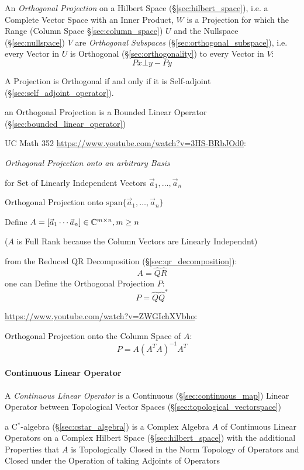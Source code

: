 An \emph{Orthogonal Projection} on a Hilbert Space (\S\ref{sec:hilbert_space}),
i.e. a Complete Vector Space with an Inner Product,
$W$ is a Projection for which the Range (Column Space \S\ref{sec:column_space})
$U$ and the Nullspace (\S\ref{sec:nullspace}) $V$ are \emph{Orthogonal
  Subspaces} (\S\ref{sec:orthogonal_subspace}), i.e. every Vector in $U$ is
Orthogonal (\S\ref{sec:orthogonality}) to every Vector in $V$:
\[
  Px \bot y - Py
\]

A Projection is Orthogonal if and only if it is Self-adjoint
(\S\ref{sec:self_adjoint_operator}).

an Orthogonal Projection is a Bounded Linear Operator
(\S\ref{sec:bounded_linear_operator})


UC Math 352 \url{https://www.youtube.com/watch?v=3HS-BRbJOd0}:

\emph{Orthogonal Projection onto an arbitrary Basis}

for Set of Linearly Independent Vectors $\vec{a}_1, \ldots, \vec{a}_n$

Orthogonal Projection onto $\mathrm{span}\{\vec{a}_1, \ldots, \vec{a}_n\}$

Define $A = [\vec{a}_1 \cdots \vec{a}_n] \in \mathbb{C}^{m \times n}, m \geq n$

($A$ is Full Rank because the Column Vectors are Linearly Independnt)

from the Reduced QR Decomposition (\S\ref{sec:qr_decomposition}):
\[
  A = \hat{Q}\hat{R}
\]
one can Define the Orthogonal Projection $P$:
\[
  P = \hat{Q}\hat{Q}^*
\]


\url{https://www.youtube.com/watch?v=ZWGIchXVbho}:

Orthogonal Projection onto the Column Space of $A$:
\[
  P = A(A^TA)^{-1}A^T
\]



\paragraph{Continuous Linear Operator}\label{sec:continuous_linear}\hfill

A \emph{Continuous Linear Operator} is a Continuous
(\S\ref{sec:continuous_map}) Linear Operator between Topological
Vector Spaces (\S\ref{sec:topological_vectorspace})

a C$^*$-algebra (\S\ref{sec:cstar_algebra}) is a Complex Algebra $A$
of Continuous Linear Operators on a Complex Hilbert Space
(\S\ref{sec:hilbert_space}) with the additional Properties that $A$ is
Topologically Closed in the Norm Topology of Operators and Closed
under the Operation of taking Adjoints of Operators

